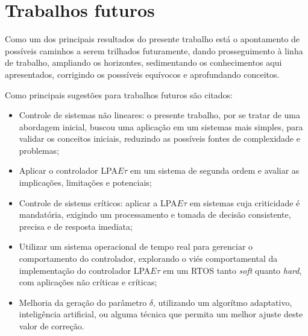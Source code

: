 \section{Trabalhos futuros}

Como um dos principais resultados do presente trabalho está o apontamento de possíveis caminhos a serem trilhados futuramente, dando prosseguimento à linha de trabalho, ampliando os horizontes, sedimentando os conhecimentos aqui apresentados, corrigindo os posssíveis equívocos e aprofundando conceitos.

Como principais sugestões para trabalhos futuros são citados:

\begin{itemize}

\item Controle de sistemas não lineares: o presente trabalho, por se tratar de uma abordagem inicial, buscou uma aplicação em um sistemas mais simples, para validar os conceitos iniciais, reduzindo as possíveis fontes de complexidade e problemas;

\item Aplicar o controlador LPA$E\tau$ em um sistema de segunda ordem e avaliar as implicações, limitações e potenciais;
  
\item Controle de sistems críticos: aplicar a LPA$E\tau$ em sistemas cuja criticidade é mandatória, exigindo um processamento e tomada de decisão consistente, precisa e de resposta imediata;

\item Utilizar um sistema operacional de tempo real para gerenciar o comportamento do controlador, explorando o viés comportamental da implementação do controlador LPA$E\tau$ em um RTOS tanto \emph{soft} quanto \emph{hard}, com aplicações não críticas e críticas;

  
\item Melhoria da geração do parâmetro $\delta$, utilizando um algorítmo adaptativo, inteligência artificial, ou alguma técnica que permita um melhor ajuste deste valor de correção.
  
\end{itemize}





